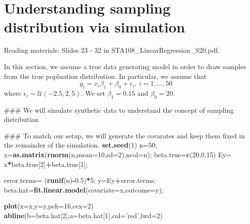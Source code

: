\documentclass[12pt,]{book}
\newenvironment{Shaded}{\begin{snugshade}}{\end{snugshade}}
\newcommand{\KeywordTok}[1]{\textcolor[rgb]{0.13,0.29,0.53}{\textbf{#1}}}
\newcommand{\DataTypeTok}[1]{\textcolor[rgb]{0.13,0.29,0.53}{#1}}
\newcommand{\DecValTok}[1]{\textcolor[rgb]{0.00,0.00,0.81}{#1}}
\newcommand{\FloatTok}[1]{\textcolor[rgb]{0.00,0.00,0.81}{#1}}
\newcommand{\StringTok}[1]{\textcolor[rgb]{0.31,0.60,0.02}{#1}}
\newcommand{\OperatorTok}[1]{\textcolor[rgb]{0.81,0.36,0.00}{\textbf{#1}}}
\newcommand{\NormalTok}[1]{#1}
\begin{document}
\section{Understanding sampling distribution via
simulation}\label{understanding-sampling-distribution-via-simulation}

Reading materials: Slides 23 - 32 in STA108\_LinearRegression\_S20.pdf.

In this section, we assume a true data generating model in order to draw
samples from the true popluation distribution. In particular, we assume
that \[ y_i = x_i \beta_1 + \beta_0 + \epsilon_i, \ i=1,\ldots, 50\]
where \(\epsilon_i \sim {\mathcal{U}}(-2.5, 2,5)\). We set
\(\beta_1=0.15\) and \(\beta_0=20\).

\begin{Shaded}
\begin{Highlighting}[]
\NormalTok{### We will simulate synthetic data to understand the concept of sampling distribution}

\NormalTok{### To match our setup, we will generate the covarates and keep them fixed in the remainder of the simulation. }
\KeywordTok{set.seed}\NormalTok{(}\DecValTok{1}\NormalTok{)}
\NormalTok{n=}\DecValTok{50}\NormalTok{;}
\NormalTok{x=}\KeywordTok{as.matrix}\NormalTok{(}\KeywordTok{rnorm}\NormalTok{(n,}\DataTypeTok{mean=}\DecValTok{10}\NormalTok{,}\DataTypeTok{sd=}\DecValTok{2}\NormalTok{),}\DataTypeTok{ncol=}\NormalTok{n);}
\NormalTok{beta.true=}\KeywordTok{c}\NormalTok{(}\DecValTok{20}\NormalTok{,}\FloatTok{0.15}\NormalTok{)}
\NormalTok{Ey=}\StringTok{ }\NormalTok{x}\OperatorTok{*}\NormalTok{beta.true[}\DecValTok{2}\NormalTok{]}\OperatorTok{+}\NormalTok{beta.true[}\DecValTok{1}\NormalTok{];}

\NormalTok{error.terms=}\StringTok{ }\NormalTok{(}\KeywordTok{runif}\NormalTok{(n)}\OperatorTok{-}\FloatTok{0.5}\NormalTok{)}\OperatorTok{*}\DecValTok{5}\NormalTok{;}
\NormalTok{y=Ey}\OperatorTok{+}\NormalTok{error.terms;}
\NormalTok{beta.hat=}\KeywordTok{fit.linear.model}\NormalTok{(}\DataTypeTok{covariate=}\NormalTok{x,}\DataTypeTok{outcome=}\NormalTok{y);}


\KeywordTok{plot}\NormalTok{(}\DataTypeTok{x=}\NormalTok{x,}\DataTypeTok{y=}\NormalTok{y,}\DataTypeTok{pch=}\DecValTok{16}\NormalTok{,}\DataTypeTok{cex=}\DecValTok{2}\NormalTok{)}
\KeywordTok{abline}\NormalTok{(}\DataTypeTok{b=}\NormalTok{beta.hat[}\DecValTok{2}\NormalTok{],}\DataTypeTok{a=}\NormalTok{beta.hat[}\DecValTok{1}\NormalTok{],}\DataTypeTok{col=}\StringTok{'red'}\NormalTok{,}\DataTypeTok{lwd=}\DecValTok{2}\NormalTok{)}



\end{Highlighting}
\end{Shaded}
\end{document}
